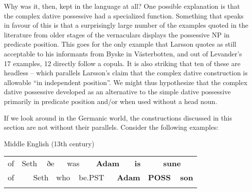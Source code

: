\begin{styleBodytextC}
Why was it, then, kept in the language at all? One possible explanation is that the complex dative possessive had a specialized function. Something that speaks in favour of this is that a surprisingly large number of the examples quoted in the literature from older stages of the vernaculars displays the possessive NP in predicate position. This goes for the only example that Larsson quotes as still acceptable to his informants from Byske in Västerbotten, and out of Levander’s 17 examples, 12 directly follow a copula. It is also striking that ten of these are headless – which parallels Larsson’s claim that the complex dative construction is allowable “in independent position”. We might thus hypothesize that the complex dative possessive developed as an alternative to the simple dative possessive primarily in predicate position and/or when used without a head noun. 

\end{styleBodytextC}

\begin{styleBodytextC}
If we look around in the Germanic world, the constructions discussed in this section are not without their parallels. Consider the following examples: 

\end{styleBodytextC}

\begin{listWWNumileveli}
\item 

\begin{styleExample}
\label{bkm:Ref126571184}Middle English (13th century)

\end{styleExample}

\end{listWWNumileveli}

\begin{tabular}{llllllllllllll}
\lsptoprule
of & \multicolumn{2}{l}{Seth

} & \multicolumn{2}{l}{ðe

} & \multicolumn{2}{l}{was

} & \multicolumn{2}{l}{{\bfseries Adam}

} & \multicolumn{2}{l}{{\bfseries is}

} & \multicolumn{2}{l}{{\bfseries sune}

} & \\
\multicolumn{2}{l}{of

} & \multicolumn{2}{l}{Seth

} & \multicolumn{2}{l}{who

} & \multicolumn{2}{l}{be.PST

} & \multicolumn{2}{l}{{\bfseries Adam}

} & \multicolumn{2}{l}{{\bfseries POSS}

} & \multicolumn{2}{l}{{\bfseries son}

}\\
\lspbottomrule
\end{tabular}

